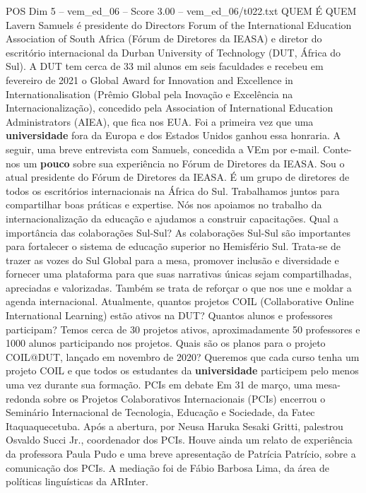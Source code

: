 \begin{textsample}{POS Dim 5 – vem\_ed\_06 – Score 3.00 – vem\_ed\_06/t022.txt}  \label{ex:f5_pos_083}
QUEM É QUEM Lavern Samuels é presidente do Directors Forum of the International Education Association of South Africa (Fórum de Diretores da IEASA) e diretor do escritório internacional da Durban University of Technology (DUT, África do Sul).
A DUT tem cerca de 33 mil alunos em seis faculdades e recebeu em fevereiro de 2021 o Global Award for Innovation and Excellence in Internationalisation (Prêmio Global pela Inovação e Excelência na Internacionalização), concedido pela Association of International Education Administrators (AIEA), que fica nos EUA.
Foi a primeira vez que uma \textbf{universidade} fora da Europa e dos Estados Unidos ganhou essa honraria.
A seguir, uma breve entrevista com Samuels, concedida a VEm por e-mail.
Conte-nos um \textbf{pouco} sobre sua experiência no Fórum de Diretores da IEASA.
Sou o atual presidente do Fórum de Diretores da IEASA.
É um grupo de diretores de todos os escritórios internacionais na África do Sul.
Trabalhamos juntos para compartilhar boas práticas e expertise.
Nós nos apoiamos no trabalho da internacionalização da educação e ajudamos a construir capacitações.
Qual a importância das colaborações Sul-Sul?
As colaborações Sul-Sul são importantes para fortalecer o sistema de educação superior no Hemisfério Sul.
Trata-se de trazer as vozes do Sul Global para a mesa, promover inclusão e diversidade e fornecer uma plataforma para que suas narrativas únicas sejam compartilhadas, apreciadas e valorizadas.
Também se trata de reforçar o que nos une e moldar a agenda internacional.
Atualmente, quantos projetos COIL (Collaborative Online International Learning) estão ativos na DUT?
Quantos alunos e professores participam?
Temos cerca de 30 projetos ativos, aproximadamente 50 professores e 1000 alunos participando nos projetos.
Quais são os planos para o projeto COIL@DUT, lançado em novembro de 2020?
Queremos que cada curso tenha um projeto COIL e que todos os estudantes da \textbf{universidade} participem pelo menos uma vez durante sua formação.
PCIs em debate Em 31 de março, uma mesa-redonda sobre os Projetos Colaborativos Internacionais (PCIs) encerrou o Seminário Internacional de Tecnologia, Educação e Sociedade, da Fatec Itaquaquecetuba.
Após a abertura, por Neusa Haruka Sesaki Gritti, palestrou Osvaldo Succi Jr., coordenador dos PCIs.
Houve ainda um relato de experiência da professora Paula Pudo e uma breve apresentação de Patrícia Patrício, sobre a comunicação dos PCIs.
A mediação foi de Fábio Barbosa Lima, da área de políticas linguísticas da ARInter.

\end{textsample}
